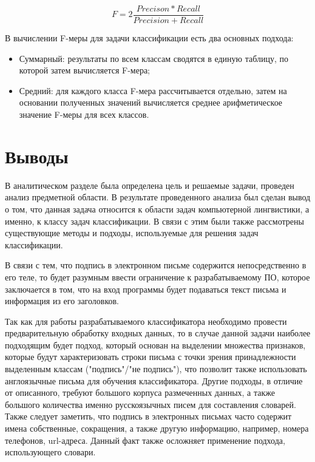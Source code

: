 \begin{equation}
F = 2\frac{Precison * Recall}{Precision+Recall}
\end{equation}

\vspace{\baselineskip}
В вычислении F-меры для задачи классификации есть два основных подхода:

\begin{itemize}
	\item Суммарный: результаты по всем классам сводятся в единую таблицу, по которой затем вычисляется F-мера;
	\item Средний: для каждого класса F-мера рассчитывается отдельно, затем на основании полученных значений вычисляется среднее арифметическое значение F-меры для всех классов.
\end{itemize}

\newpage
\section{Выводы}
В аналитическом разделе была определена цель и решаемые задачи, проведен анализ предметной области. В результате проведенного анализа был сделан вывод о том, что данная задача относится к области задач компьютерной лингвистики, а именно, к классу задач классификации. В связи с этим были также рассмотрены существующие методы и подходы, используемые для решения задач классификации.

В связи с тем, что подпись в электронном письме содержится непосредственно в его теле, то будет разумным ввести ограничение к разрабатываемому ПО, которое заключается в том, что на вход программы будет подаваться текст письма и информация из его заголовков.

Так как для работы разрабатываемого классификатора необходимо провести предварительную обработку входных данных, то в случае данной задачи наиболее подходящим будет подход, который основан на выделении множества признаков, которые будут характеризовать строки письма с точки зрения принадлежности выделенным классам ("подпись"/"не подпись"), что позволит также использовать англоязычные письма для обучения классификатора. Другие подходы, в отличие от описанного, требуют большого корпуса размеченных данных, а также большого количества именно русскоязычных писем для составления словарей. Также следует заметить, что подпись в электронных письмах часто содержит имена собственные, сокращения, а также другую информацию, например, номера телефонов, url-адреса. Данный факт также осложняет применение подхода, использующего словари.

